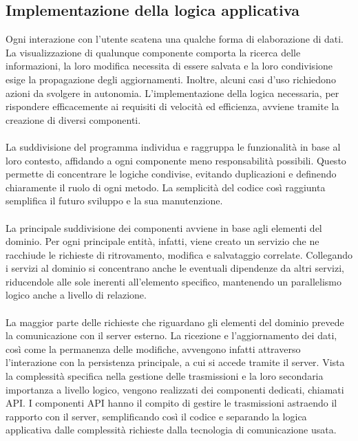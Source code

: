 \clearpage

\subsection{Implementazione della logica applicativa}

Ogni interazione con l'utente scatena una qualche forma di elaborazione di dati.
La visualizzazione di qualunque componente comporta la ricerca delle informazioni,
la loro modifica necessita di essere salvata e
la loro condivisione esige la propagazione degli aggiornamenti.
Inoltre, alcuni casi d'uso richiedono azioni da svolgere in autonomia.
L'implementazione della logica necessaria,
per rispondere efficacemente ai requisiti di velocità ed efficienza,
avviene tramite la creazione di diversi componenti.\\
\\
La suddivisione del programma individua e raggruppa le funzionalità in base al loro contesto,
affidando a ogni componente meno responsabilità possibili.
Questo permette di concentrare le logiche condivise,
evitando duplicazioni e definendo chiaramente il ruolo di ogni metodo.
La semplicità del codice così raggiunta semplifica il futuro sviluppo e la sua manutenzione.\\
\\
La principale suddivisione dei componenti avviene in base agli elementi del dominio.
Per ogni principale entità, infatti, viene creato un servizio che ne racchiude
le richieste di ritrovamento, modifica e salvataggio correlate.
Collegando i servizi al dominio si concentrano anche le eventuali dipendenze da altri servizi,
riducendole alle sole inerenti all'elemento specifico,
mantenendo un parallelismo logico anche a livello di relazione.\\
\\
La maggior parte delle richieste
che riguardano gli elementi del dominio prevede
la comunicazione con il server esterno.
La ricezione e l'aggiornamento dei dati,
così come la permanenza delle modifiche,
avvengono infatti attraverso l'interazione con la persistenza principale,
a cui si accede tramite il server.
Vista la complessità specifica nella gestione delle trasmissioni e
la loro secondaria importanza a livello logico,
vengono realizzati dei componenti dedicati, chiamati API.
I componenti API hanno il compito di gestire le trasmissioni
astraendo il rapporto con il server,
semplificando così il codice e separando la logica applicativa
dalle complessità richieste dalla tecnologia di comunicazione usata.

